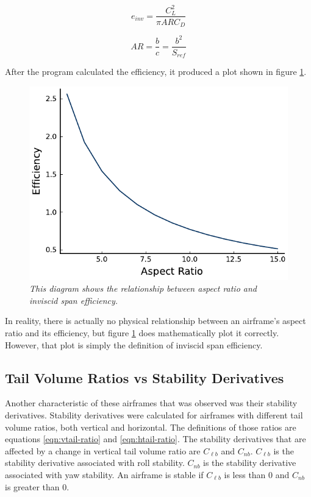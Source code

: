 \documentclass{journal}
\begin{document}
	\begin{equation}
		e_{inv} = \frac{C_L^2}{\pi{ARC_D}}
		\label{eqn:efficiency}
	\end{equation}
	
	\begin{equation}
		AR = \frac{b}{c} = \frac{b^2}{S_{ref}}
		\label{eqn:aspect-ratio}
	\end{equation}
	
	After the program calculated the efficiency, it produced a plot shown in figure \ref{fig:efficiency}.\\
	
	\begin{figure}[H]
		\centering
		\includegraphics{../graphics/efficiency.pdf}
		\caption{\emph{This diagram shows the relationship between aspect ratio and inviscid span efficiency.}}
		\label{fig:efficiency}
	\end{figure}
	
	In reality, there is actually no physical relationship between an airframe's aspect ratio and its efficiency, but figure \ref{fig:efficiency} does mathematically plot it correctly. However, that plot is simply the definition of inviscid span efficiency.\\
	
	\subsection{Tail Volume Ratios vs Stability Derivatives}
	
	Another characteristic of these airframes that was observed was their stability derivatives. Stability derivatives were calculated for airframes with different tail volume ratios, both vertical and horizontal. The definitions of those ratios are equations \ref{eqn:vtail-ratio} and \ref{eqn:htail-ratio}. The stability derivatives that are affected by a change in vertical tail volume ratio are \(C_{\ell{b}}\) and \(C_{nb}\). \(C_{\ell{b}}\) is the stability derivative associated with roll stability. \(C_{nb}\) is the stability derivative associated with yaw stability. An airframe is stable if \(C_{\ell{b}}\) is less than 0 and \(C_{nb}\) is greater than 0.\\
	
\end{document}
